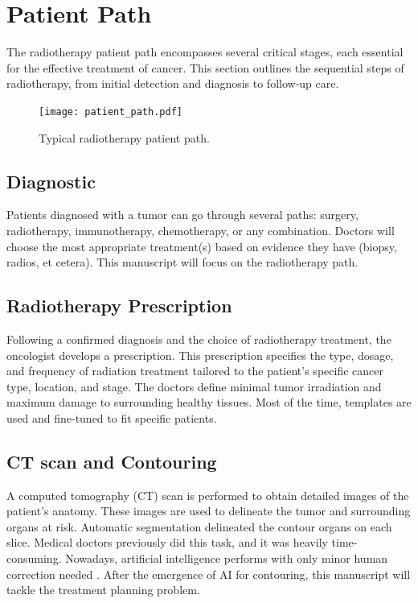 \section{Patient Path}
The radiotherapy patient path encompasses several critical stages, each essential for the effective treatment of cancer.
This section outlines the sequential steps of radiotherapy, from initial detection and diagnosis to follow-up care.
\begin{figure}
	\centering
	\texttt{[image: patient\_path.pdf]}
	\caption{Typical radiotherapy patient path.}
	\label{fig:patient_path}
\end{figure}

\subsection{Diagnostic}
Patients diagnosed with a tumor can go through several paths: surgery, radiotherapy, immunotherapy, chemotherapy, or any combination.
Doctors will choose the most appropriate treatment(s) based on evidence they have (biopsy, radios, et cetera).
This manuscript will focus on the radiotherapy path.

\subsection{Radiotherapy Prescription}
Following a confirmed diagnosis and the choice of radiotherapy treatment, the oncologist develops a prescription.
This prescription specifies the type, dosage, and frequency of radiation treatment tailored to the patient's specific cancer type, location, and stage.
The doctors define minimal tumor irradiation and maximum damage to surrounding healthy tissues.
Most of the time, templates are used and fine-tuned to fit specific patients.

\subsection{CT scan and Contouring}
A computed tomography (CT) scan is performed to obtain detailed images of the patient's anatomy.
These images are used to delineate the tumor and surrounding organs at risk.
Automatic segmentation delineated the contour organs on each slice.
Medical doctors previously did this task, and it was heavily time-consuming.
Nowadays, artificial intelligence performs with only minor human correction needed \cite{Strolin2023} \cite{Bustos2023}.
After the emergence of AI for contouring, this manuscript will tackle the treatment planning problem.

